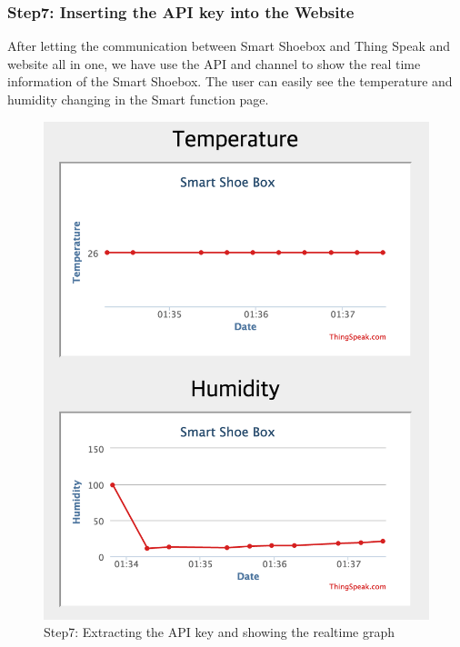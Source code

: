 \documentclass[conference]{IEEEtran}
\begin{document}
\subsubsection{Step7: Inserting the API key into the Website}
After letting the communication between Smart Shoebox and Thing Speak and website all in one, we have use the API and channel to show the real time information of the Smart Shoebox. The user can easily see the temperature and humidity changing in the Smart function page.
\begin{figure}[H]
\begin{center}
    \includegraphics[scale=0.45]{step7}
    \caption{Step7: Extracting the API key and showing the realtime graph} \label{fig:label}
\end{center}
\end{figure}
\end{document}

